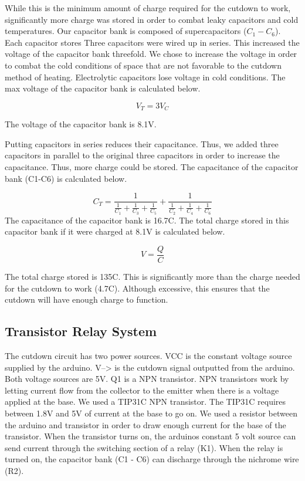 \documentclass[12pt,]{article}
\begin{document}
While this is the minimum amount of charge required for the cutdown to
work, significantly more charge was stored in order to combat leaky
capacitors and cold temperatures. Our capacitor bank is composed of
supercapacitors (\(C_{1}-C_{6}\)). Each capacitor stores Three
capacitors were wired up in series. This increased the voltage of the
capacitor bank threefold. We chose to increase the voltage in order to
combat the cold conditions of space that are not favorable to the
cutdown method of heating. Electrolytic capacitors lose voltage in cold
conditions. The max voltage of the capacitor bank is calculated below.

\[V_{T} = 3V_{C}\]

The voltage of the capacitor bank is 8.1V.

Putting capacitors in series reduces their capacitance. Thus, we added
three capacitors in parallel to the original three capacitors in order
to increase the capacitance. Thus, more charge could be stored. The
capacitance of the capacitor bank (C1-C6) is calculated below.

\[C_{T} = \frac{1}{\frac{1}{C_{1}} + \frac{1}{C_{3}} + \frac{1}{C_{5}}}+\frac{1}{\frac{1}{C_{2}} + \frac{1}{C_{4}} + \frac{1}{C_{6}}}\]
The capacitance of the capacitor bank is 16.7C. The total charge stored
in this capacitor bank if it were charged at 8.1V is calculated below.

\[V=\frac{Q}{C}\]

The total charge stored is 135C. This is significantly more than the
charge needed for the cutdown to work (4.7C). Although excessive, this
ensures that the cutdown will have enough charge to function.

\subsection{Transistor Relay System}\label{transistor-relay-system}

The cutdown circuit has two power sources. VCC is the constant voltage
source supplied by the arduino. V--\textgreater{} is the cutdown signal
outputted from the arduino. Both voltage sources are 5V. Q1 is a NPN
transistor. NPN transistors work by letting current flow from the
collector to the emitter when there is a voltage applied at the base. We
used a TIP31C NPN transistor. The TIP31C requires between 1.8V and 5V of
current at the base to go on. We used a resistor between the arduino and
transistor in order to draw enough current for the base of the
transistor. When the transistor turns on, the arduinos constant 5 volt
source can send current through the switching section of a relay (K1).
When the relay is turned on, the capacitor bank (C1 - C6) can discharge
through the nichrome wire (R2).
\end{document}
